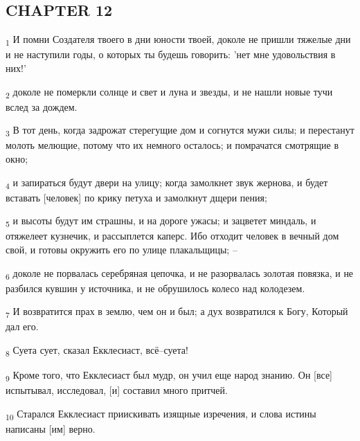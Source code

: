 \subsection{CHAPTER 12}
\begin{tcolorbox}
\textsubscript{1} И помни Создателя твоего в дни юности твоей, доколе не пришли тяжелые дни и не наступили годы, о которых ты будешь говорить: 'нет мне удовольствия в них!'
\end{tcolorbox}
\begin{tcolorbox}
\textsubscript{2} доколе не померкли солнце и свет и луна и звезды, и не нашли новые тучи вслед за дождем.
\end{tcolorbox}
\begin{tcolorbox}
\textsubscript{3} В тот день, когда задрожат стерегущие дом и согнутся мужи силы; и перестанут молоть мелющие, потому что их немного осталось; и помрачатся смотрящие в окно;
\end{tcolorbox}
\begin{tcolorbox}
\textsubscript{4} и запираться будут двери на улицу; когда замолкнет звук жернова, и будет вставать [человек] по крику петуха и замолкнут дщери пения;
\end{tcolorbox}
\begin{tcolorbox}
\textsubscript{5} и высоты будут им страшны, и на дороге ужасы; и зацветет миндаль, и отяжелеет кузнечик, и рассыплется каперс. Ибо отходит человек в вечный дом свой, и готовы окружить его по улице плакальщицы; --
\end{tcolorbox}
\begin{tcolorbox}
\textsubscript{6} доколе не порвалась серебряная цепочка, и не разорвалась золотая повязка, и не разбился кувшин у источника, и не обрушилось колесо над колодезем.
\end{tcolorbox}
\begin{tcolorbox}
\textsubscript{7} И возвратится прах в землю, чем он и был; а дух возвратился к Богу, Который дал его.
\end{tcolorbox}
\begin{tcolorbox}
\textsubscript{8} Суета сует, сказал Екклесиаст, всё--суета!
\end{tcolorbox}
\begin{tcolorbox}
\textsubscript{9} Кроме того, что Екклесиаст был мудр, он учил еще народ знанию. Он [все] испытывал, исследовал, [и] составил много притчей.
\end{tcolorbox}
\begin{tcolorbox}
\textsubscript{10} Старался Екклесиаст приискивать изящные изречения, и слова истины написаны [им] верно.
\end{tcolorbox}
